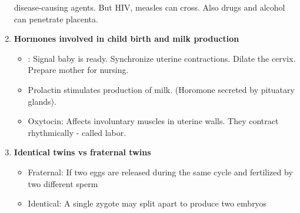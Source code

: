 \documentclass[9pt]{article}
\begin{document}
\begin{enumerate}
    disease-causing agents. But HIV, measles can cross. Also drugs and
    alcohol can penetrate placenta.
  \item {\bf Hormones involved in child birth and milk production}
    \begin{itemize}
      \item: Signal baby is ready. Synchronize uterine
        contractions. Dilate the cervix. Prepare mother for nursing.
      \item Prolactin stimulates production of milk. (Horomone
        secreted by pituatary glands).
      \item Oxytocin: Affects involuntary muscles in uterine
        walls. They contract rhythmically - called labor.
    \end{itemize}    
  \item {\bf Identical twins vs fraternal twins}
    \begin{itemize}
    \item Fraternal: If two eggs are released during the same cycle
      and fertilized by two different sperm
    \item Identical: A single zygote may split apart to produce two
      embryos
    \end{itemize}
\end{enumerate}
\end{document}
